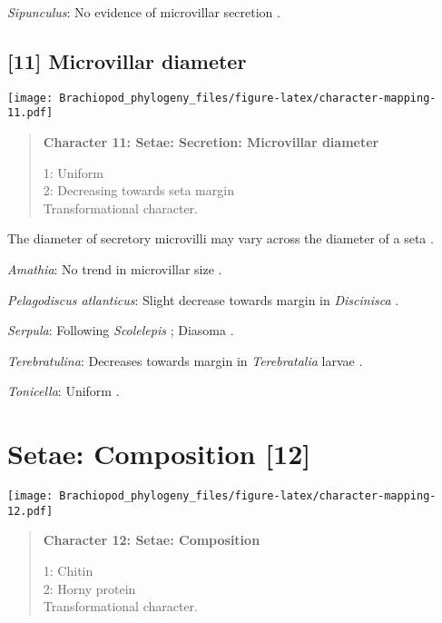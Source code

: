 \documentclass[openany]{book}
\theoremstyle{definition}
\theoremstyle{definition}
\theoremstyle{definition}
\theoremstyle{remark}
\begin{document}
\hypertarget{Sipunculus-coding-10}{}
\emph{Sipunculus}: No evidence of microvillar secretion
\citep[e.g.][]{Schulze2005}.

\subsection*{{[}11{]} Microvillar diameter}\label{microvillar-diameter}

\texttt{[image: Brachiopod\_phylogeny\_files/figure-latex/character-mapping-11.pdf]}

\begin{quote}
\textbf{Character 11: Setae: Secretion: Microvillar diameter}

1: Uniform\\
2: Decreasing towards seta margin\\
Transformational character.
\end{quote}

The diameter of secretory microvilli may vary across the diameter of a
seta \citep{Smith2014}.

\hypertarget{Amathia-coding-11}{}
\emph{Amathia}: No trend in microvillar size \citep{Gordon1975}.

\hypertarget{Pelagodiscus_atlanticus-coding-11}{}
\emph{Pelagodiscus atlanticus}: Slight decrease towards margin in
\emph{Discinisca} \citep{Luter2003}.

\hypertarget{Serpula-coding-11}{}
\emph{Serpula}: Following \emph{Scolelepis} \citep{Hausen2005}; Diasoma
\citep{Orrhage1971}.

\hypertarget{Terebratulina-coding-11}{}
\emph{Terebratulina}: Decreases towards margin in \emph{Terebratalia}
larvae \citep{Gustus1972}.

\hypertarget{Tonicella-coding-11}{}
\emph{Tonicella}: Uniform \citep{Fischer1980, Leise1982}.

\section{Setae: Composition {[}12{]}}\label{setae-composition-12}

\texttt{[image: Brachiopod\_phylogeny\_files/figure-latex/character-mapping-12.pdf]}

\begin{quote}
\textbf{Character 12: Setae: Composition}

1: Chitin\\
2: Horny protein\\
Transformational character.
\end{quote}
\end{document}
